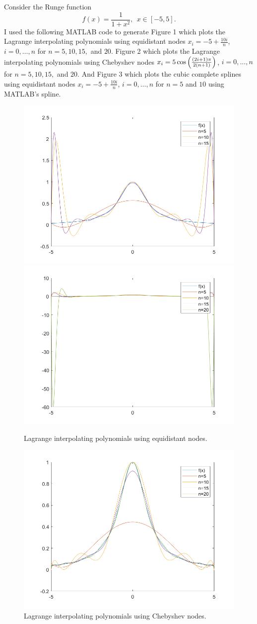 \documentclass[12pt]{report}
\begin{document}
\begin{solution}

    \noindent
    Consider the Runge function 
    \[ 
        f(x) = \frac{1}{1 + x^2}, ~~ x\in[-5,5].
    \]
    I used the following MATLAB code to generate Figure 1 which plots the Lagrange interpolating polynomials using equidistant nodes $x_i = -5 + \frac{10i}{n}$, $i= 0, \dots,n$ for $n=5,10,15,$ and $20$. Figure 2 which plots the Lagrange interpolating polynomials using Chebyshev nodes $x_i = 5\cos{\left(\frac{(2i + 1)\pi}{2(n+1)}\right)}$, $i= 0, \dots,n$ for $n=5,10,15,$ and $20$. And Figure 3 which plots the cubic complete splines using equidistant nodes $x_i = -5 + \frac{10i}{n}$, $i= 0, \dots,n$ for $n=5$ and $10$ using MATLAB's spline.

    \begin{figure}
        \center
        \includegraphics[width = 0.49\linewidth]{plots/Q5a1.png}
        \includegraphics[width = 0.49\linewidth]{plots/Q5a2.png}
        \caption{Lagrange interpolating polynomials using equidistant nodes.}
    \end{figure}


    \begin{figure}
        \center
        \includegraphics[width = 0.6\linewidth]{plots/Q5b.png}
        \caption{Lagrange interpolating polynomials using Chebyshev nodes.}


\end{figure}
\end{solution}
\end{document}
